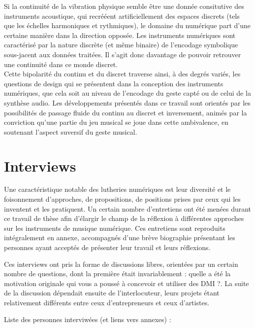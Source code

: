 Si la continuité de la vibration physique semble être une donnée consitutive des instruments acoustique, qui recrééent artificiellement des espaces discrets (tels que les échelles harmoniques et rythmiques), le domaine du numérique part d'une certaine manière dans la direction opposée. Les instruments numériques sont caractérisé par la nature discrète (et même binaire) de l'encodage symbolique sous-jacent aux données traitées. Il s'agit donc davantage de pouvoir retrouver une continuité dans ce monde discret.\\
Cette bipolarité du continu et du discret traverse ainsi, à des degrés variés, les questions de design qui se présentent dans la conception des instruments numériques, que cela soit au niveau de l'encodage du geste capté ou de celui de la synthèse audio. Les développements présentés dans ce travail sont orientés par les possibilités de passage fluide du continu au discret et inversement, animés par la conviction qu'une partie du jeu musical se joue dans cette ambivalence, en soutenant l'aspect suversif du geste musical.


\section{Interviews}

Une caractéristique notable des lutheries numériques est leur diversité et le foisonnement d'approches, de propositions, de positions prises par ceux qui les inventent et les pratiquent. Un certain nombre d'entretiens ont été menées durant ce travail de thèse afin d'élargir le champ de la réflexion à différentes approches sur les instruments de musique numérique. Ces entretiens sont reproduits intégralement en annexe, accompagnés d'une brève biographie présentant les personnes ayant acceptés de présenter leur travail et leurs réflexions.

Ces interviews ont pris la forme de discussions libres, orientées par un certain nombre de questions, dont la première était invariablement : quelle a été la motivation originale qui vous a poussé à concevoir et utiliser des DMI ?. La suite de la discussion dépendait ensuite de l'interlocuteur, leurs projets étant relativement différents entre ceux d'entrepreneurs et ceux d'artistes. %


Liste des personnes interviwées (et liens vers annexes) :

